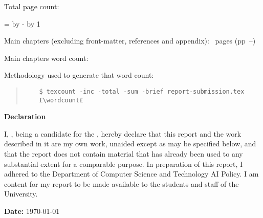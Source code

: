 \ifsubmission

\begin{defaultsffamily} %
Total page count: \pageref{LastPage}

\makeatletter
\@tempcnta=\relax%
\advance\@tempcnta by -%
\advance\@tempcnta by 1%
\xdef\contentpages{\the\@tempcnta}%
\makeatother

Main chapters (excluding front-matter, references and appendix):
\contentpages~pages
(pp~\pageref{firstcontentpage}--\pageref{lastcontentpage})

Main chapters word count: \wordcount

\vspace*{1em}
Methodology used to generate that word count:

\begin{quote}
\begin{verbatim}
    $ texcount -inc -total -sum -brief report-submission.tex
    £\wordcount£
\end{verbatim}
\end{quote}


\vspace{\fill}
\onehalfspacing
\makeatletter
\textbf{\Huge Declaration}
\vspace{40pt}

I, \candidatenumber, being a candidate for the \course, hereby declare that
this report and the work described in it are my own work, unaided except as may
be specified below, and that the report does not contain material that has
already been used to any substantial extent for a comparable purpose. In
preparation of this report, I adhered to the Department of Computer Science and
Technology AI Policy. I am content for my report to be made available to the
students and staff of the University.

\bigskip
\textbf{Date:} \today
\vspace{\fill}

\makeatother

\end{defaultsffamily}
\vspace{\fill}
\onehalfspacing






